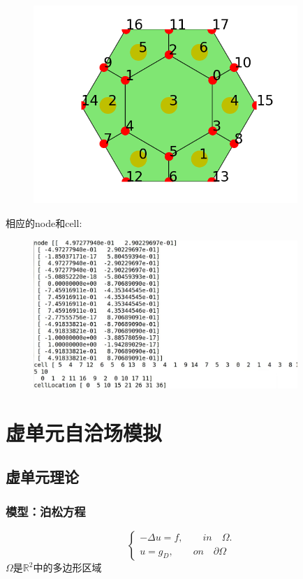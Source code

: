 \documentclass[12pt]{article}
\begin{document}
\begin{CJK}{UTF8}{gkai}
     \begin{figure}[H]
     \centering
     \includegraphics[width=10cm]{Figure_1.png}
     \caption{}  		
     \end{figure}

    相应的node和cell:\\

   \begin{figure}[H]
    \centering   
    \includegraphics[width=10cm]{1.jpg}
    \caption{}
    \end{figure}
    
    \section{虚单元自洽场模拟}
    
     \subsection{虚单元理论}
    
  \subsubsection{模型：泊松方程}
    
     \begin{equation}\label{eq:dirichlet}
     \begin{cases}
     -\Delta u =f,\qquad  in\quad \Omega.\\
     u=g_D,\qquad on \quad\partial \Omega 
     \end{cases}
     \end{equation}
     $\Omega $是$\mathbb{R}^2$中的多边形区域\\
     

\end{CJK}
\end{document}
